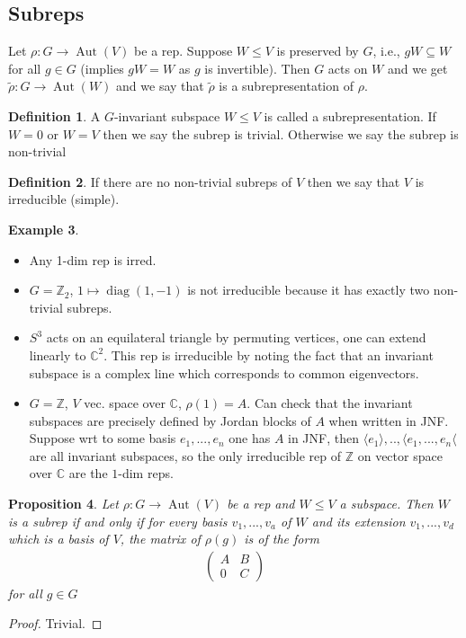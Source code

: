 \documentclass{article}
\theoremstyle{definition}
\newtheorem{defn}{Definition}[section]
\newtheorem{example}[defn]{Example}
\theoremstyle{remark}
\theoremstyle{plain}
\newtheorem{prop}[defn]{Proposition}
\newcommand{\ZZ}{\mathbb{Z}}
\newcommand{\CC}{\mathbb{C}}
\begin{document}
\subsection{Subreps}
Let $\rho:G\to\operatorname{Aut}(V)$ be a rep. Suppose $W\le V$ is preserved by $G$, i.e., $gW\subseteq W$ for all $g\in G$ (implies $gW=W$ as $g$ is invertible). Then $G$ acts on $W$ and we get $\tilde{\rho}: G\to\operatorname{Aut}(W)$ and we say that $\tilde{\rho}$ is a subrepresentation of $\rho$.
\begin{defn}
    A $G$-invariant subspace $W\le V$ is called a subrepresentation. If $W=0$ or $W=V$ then we say the subrep is trivial. Otherwise we say the subrep is non-trivial
\end{defn}
\begin{defn}
    If there are no non-trivial subreps of $V$ then we say that $V$ is irreducible (simple).
\end{defn}
 \begin{example}
     \begin{itemize}
         \item Any 1-dim rep is irred.
         \item $G=\ZZ_2$, $1\mapsto\operatorname{diag}(1,-1)$ is not irreducible because it has exactly two non-trivial subreps.
         \item $S^3$ acts on an equilateral triangle by permuting vertices, one can extend linearly to $\CC^2$. This rep is irreducible by noting the fact that an invariant subspace is a complex line which corresponds to common eigenvectors.
         \item $G=\ZZ$, $V$ vec. space over $\CC$, $\rho(1)=A$. Can check that the invariant subspaces are precisely defined by Jordan blocks of $A$ when written in JNF. Suppose wrt to some basis $e_1,...,e_n$ one has $A$ in JNF, then $\langle e_1\rangle,..,\langle e_1,...,e_n\langle$ are all invariant subspaces, so the only irreducible rep of $\ZZ$ on vector space over $\CC$ are the $1$-dim reps.
     \end{itemize}
 \end{example}
 \begin{prop}
     Let $\rho:G\to\operatorname{Aut}(V)$ be a rep and $W\le V$ a subspace. Then $W$ is a subrep if and only if for every basis $v_1,...,v_a$ of $W$ and its extension $v_1,...,v_d$ which is a basis of $V$, the matrix of $\rho(g)$ is of the form
     \begin{align*}
     \begin{pmatrix}
         A & B\\ 0&C
     \end{pmatrix}
     \end{align*} for all $g\in G$
 \end{prop}
 \begin{proof}
 Trivial.
 \end{proof}
\end{document}
